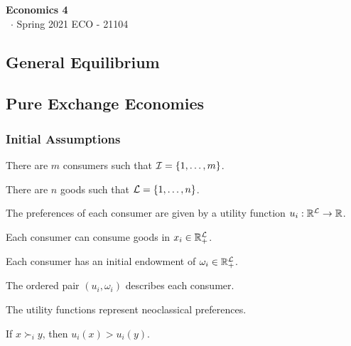 \documentclass[8pt,a4paper]{extarticle}
\renewcommand{\csClass}{Economics 4}
\renewcommand{\csClassCode}{ECO - 21104}
\renewcommand{\csTerm}{Spring 2021}
\begin{document}
\begin{titlepage}
    \begin{center}
	\vspace*{1cm}
	\Huge
        \textbf{\csClass}
	\vspace{0.5cm} \\
	\Large
        \cs\ $\cdot$ \csTerm
        \vfill
        \csAuthorName
	\vspace{0.8cm}
        \csClassCode\\
        \csSchool     
    \end{center}
\end{titlepage}

\begin{multicols}{3}
\setcounter{page}{1}

\section{General Equilibrium}

\subsection{Pure Exchange Economies}

\subsubsection*{Initial Assumptions}

\begin{bulletlist}
\item There are $m$ consumers such that $\mathcal{I} = \{1, \ldots, m\}$.
\item There are $n$ goods such that $\mathcal{L} = \{1, \ldots, n\}$.
\item The preferences of each consumer are given by a utility function $u_i : \mathbb{R}^{\mathcal{L}} \to \mathbb{R}$.
\item Each consumer can consume goods in $x_i \in \mathbb{R}_+^{\mathcal{L}}$.
\item Each consumer has an initial endowment of $\omega_i \in \mathbb{R}_+^{\mathcal{L}}$.
\item The ordered pair $(u_i, \omega_i)$ describes each consumer.
\item The utility functions represent neoclassical preferences.
\end{bulletlist}

\begin{boxprop}
	If $x \succ_i y$, then $u_i(x) > u_i(y)$.
\end{boxprop}


\end{multicols}
\end{document}
